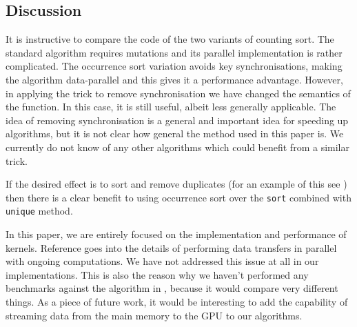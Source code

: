 
\subsection {Discussion} 

It is instructive to compare the code of the two variants of counting
sort. The standard algorithm requires mutations and its parallel
implementation is rather complicated. The occurrence sort variation
avoids key synchronisations, making the algorithm
data-parallel and this gives it a performance advantage. However, in
applying the trick to remove synchronisation we have changed the
semantics of the function. In this case, it is still useful, albeit less
generally applicable. The idea of removing synchronisation is a
general and important idea for speeding up algorithms, but it is not
clear how general the method used in this paper is.  We currently do
not know of any other algorithms which could benefit from a similar
trick.

If the desired effect is to sort and remove duplicates 
(for an example of this see ) then 
there is a clear benefit to using occurrence sort
over the {\tt sort} combined with {\tt unique} method. 

In this paper, we are entirely focused on the implementation and
performance of kernels. Reference  goes into the details
of performing data transfers in parallel with ongoing computations. We
have not addressed this issue at all in our implementations. This is
also the reason why we haven't performed any benchmarks against the algorithm in
, because it would compare very different things. As a
piece of future work, it would be interesting to add the capability of
streaming data from the main memory to the GPU to our algorithms.

